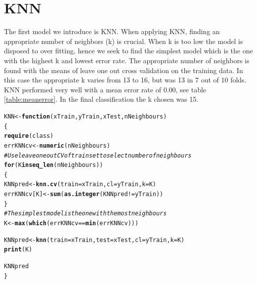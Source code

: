\documentclass[a4paper,draft=false]{scrreprt}\usepackage[]{graphicx}\usepackage[]{color}
\makeatletter
\newcommand{\hlcom}[1]{\textcolor[rgb]{0.678,0.584,0.686}{\textit{#1}}}%
\newcommand{\hlopt}[1]{\textcolor[rgb]{0,0,0}{#1}}%
\newcommand{\hlstd}[1]{\textcolor[rgb]{0.345,0.345,0.345}{#1}}%
\newcommand{\hlkwa}[1]{\textcolor[rgb]{0.161,0.373,0.58}{\textbf{#1}}}%
\newcommand{\hlkwb}[1]{\textcolor[rgb]{0.69,0.353,0.396}{#1}}%
\newcommand{\hlkwc}[1]{\textcolor[rgb]{0.333,0.667,0.333}{#1}}%
\newcommand{\hlkwd}[1]{\textcolor[rgb]{0.737,0.353,0.396}{\textbf{#1}}}%
\newenvironment{kframe}{%
 \def\at@end@of@kframe{}%
 \ifinner\ifhmode%
  \def\at@end@of@kframe{\end{minipage}}%
  \begin{minipage}{\columnwidth}%
 \fi\fi%
 \def\FrameCommand##1{\hskip\@totalleftmargin \hskip-\fboxsep
 \colorbox{shadecolor}{##1}\hskip-\fboxsep
     \hskip-\linewidth \hskip-\@totalleftmargin \hskip\columnwidth}%
 \MakeFramed {\advance\hsize-\width
   \@totalleftmargin\z@ \linewidth\hsize
   \@setminipage}}%
 {\par\unskip\endMakeFramed%
 \at@end@of@kframe}
\newenvironment{knitrout}{}{} %
\makeatother
\begin{document}
\section{KNN} %
The first model we introduce is KNN. When applying KNN, finding an appropriate number of neighbors (k) is crucial. When k is too low the model is disposed to over fitting, hence we seek to find the simplest model which is the one with the highest k and lowest error rate. The appropriate number of neighbors is found with the means of leave one out cross validation on the training data. In this case the appropriate k varies from 13 to 16, but was 13 in 7 out of 10 folds. KNN performed very well with a mean error rate of 0.00, see table \ref{table:meanerror}. In the final classification the k chosen was 15. 
\begin{knitrout}
\color{fgcolor}\begin{kframe}
\begin{alltt}
\hlstd{KNN} \hlkwb{<-} \hlkwa{function}\hlstd{(}\hlkwc{xTrain}\hlstd{,} \hlkwc{yTrain}\hlstd{,} \hlkwc{xTest}\hlstd{,} \hlkwc{nNeighbours}\hlstd{)}
\hlstd{\{}
  \hlkwd{require}\hlstd{(class)}
  \hlstd{errKNNcv} \hlkwb{<-} \hlkwd{numeric}\hlstd{(nNeighbours)}
  \hlcom{# Use leave one out CV of train set to select number of neighbours}
  \hlkwa{for} \hlstd{(K} \hlkwa{in} \hlkwd{seq_len}\hlstd{(nNeighbours))}
  \hlstd{\{}
    \hlstd{KNNpred} \hlkwb{<-} \hlkwd{knn.cv}\hlstd{(}\hlkwc{train} \hlstd{= xTrain,} \hlkwc{cl} \hlstd{= yTrain,} \hlkwc{k} \hlstd{= K)}
    \hlstd{errKNNcv[K]} \hlkwb{<-} \hlkwd{sum}\hlstd{(}\hlkwd{as.integer}\hlstd{(KNNpred} \hlopt{!=} \hlstd{yTrain))}
  \hlstd{\}}
  \hlcom{# The simplest model is the one with the most neighbours}
  \hlstd{K} \hlkwb{<-} \hlkwd{max}\hlstd{(}\hlkwd{which}\hlstd{(errKNNcv} \hlopt{==} \hlkwd{min}\hlstd{(errKNNcv)))}

  \hlstd{KNNpred} \hlkwb{<-} \hlkwd{knn}\hlstd{(}\hlkwc{train} \hlstd{= xTrain,} \hlkwc{test} \hlstd{= xTest,} \hlkwc{cl} \hlstd{= yTrain,} \hlkwc{k} \hlstd{= K)}
  \hlkwd{print}\hlstd{(K)}

  \hlstd{KNNpred}
\hlstd{\}}
\end{alltt}
\end{kframe}
\end{knitrout}
\end{document}
